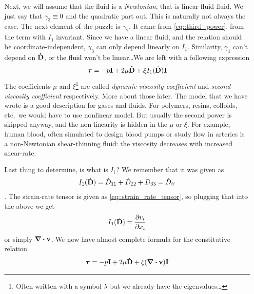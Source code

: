 \documentclass[a4paper]{article}
\begin{document}
Next, we will assume that the fluid is a \emph{Newtonian}, that is linear fluid
fluid. We just say that \(\gamma_3 \equiv 0\) and  the quadratic part out. This is naturally not always the
case. The next element of the puzzle is \(\gamma_2\). It came from
\autoref{eq::third_power}, from the term with \(I_1\) invariant. Since we have a
linear fluid, and the relation should be coordinate-independent, \(\gamma_3\) can
only depend linearly on \(I_1\). Similarity, \(\gamma_1\) can't depend on
\(\vb{\dot{D}}\), or the fluid won't be linear\dots We are left with a following
expression
\begin{equation}
	\bm{\tau} = -p\vb{I} +  2\mu\vb{\dot{D}} + \xi I_1(\dot{\vb{D}}) \vb{I}
\end{equation}
The coefficients \(\mu\) and \(\xi\)\footnote{Often written with a symbol
	\(\lambda\) but we already have the eigenvalues\dots} are called
\emph{dynamic viscosity coefficient} and \emph{second viscosity coefficient}
respectively. More about those later. The model that we have wrote is a good
description for gases and  fluids. For polymers, resins, colloids,
etc.\ we would have to use nonlinear model. But usually the second power is
skipped anyway, and the non-linearity is hidden in the \(\mu\) or \(\xi\).
For example, human blood, often simulated to design blood pumps or study flow
in arteries is a non-Newtonian shear-thinning fluid: the viscosity decreases
with increased shear-rate.

Last thing to determine, is what is \(I_1\)? We remember that it was given as
\[
	I_1(\dot{\vb{D}}) = \dot{D}_{11} + \dot{D}_{22} + \dot{D}_{33} =
	\dot{D}_{ii}\].
The strain-rate tensor is given as \autoref{eq::strain_rate_tensor}, so
plugging that into the above we get
\[
	I_1(\dot{\vb{D}}) = \pdv{v_i}{x_i}
\]
or simply \(\div\vb{v}\). We now have almost complete formula for the
constitutive relation
\begin{equation*}
	\bm{\tau} = -p\vb{I} +  2\mu\vb{\dot{D}} + \xi (\div\vb{v}) \vb{I}
\end{equation*}
\end{document}
